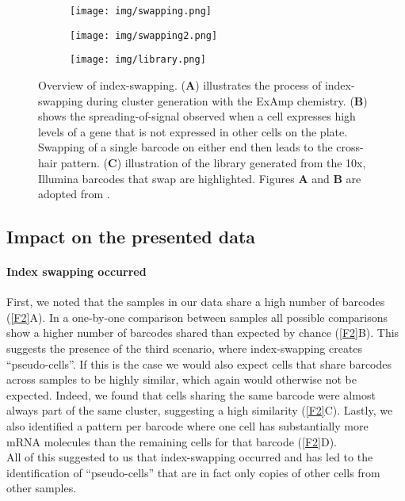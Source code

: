 \documentclass{article}
\begin{document}
\begin{figure}
    \begin{subfigure}[c]{0.5\textwidth}
	\texttt{[image: img/swapping.png]}
    \caption{}
    \end{subfigure}
    \begin{subfigure}[c]{0.5\textwidth}
	\texttt{[image: img/swapping2.png]}
    \caption{}
    \end{subfigure}
    \begin{subfigure}[c]{0.5\textwidth}
	\texttt{[image: img/library.png]}
    \caption{}
    \end{subfigure}
    \caption{Overview of index-swapping.
	(\textbf{A}) illustrates the process of index-swapping during cluster generation with the ExAmp chemistry.
	(\textbf{B}) shows the spreading-of-signal observed when a cell expresses high levels of a gene that is not expressed in other cells on the plate.
	Swapping of a single barcode on either end then leads to the cross-hair pattern.
	(\textbf{C}) illustration of the library generated from the 10x, Illumina barcodes that swap are highlighted. 
	Figures \textbf{A} and \textbf{B} are adopted from \autocite{Sinha2017}.
    }
    \label{F1}
\end{figure}

\subsection*{Impact on the presented data}
\paragraph{Index swapping occurred}
First, we noted that the samples in our data share a high number of barcodes (\autoref{F2}A).
In a one-by-one comparison between samples all possible comparisons show a higher number of barcodes shared than expected by chance (\autoref{F2}B).
This suggests the presence of the third scenario, where index-swapping creates ``pseudo-cells''.
If this is the case we would also expect cells that share barcodes across samples to be highly similar, which again would otherwise not be expected.
Indeed, we found that cells sharing the same barcode were almost always part of the same cluster, suggesting a high similarity (\autoref{F2}C).
Lastly, we also identified a pattern per barcode where one cell has substantially more mRNA molecules than the remaining cells for that barcode (\autoref{F2}D). \\
All of this suggested to us that index-swapping occurred and has led to the identification of ``pseudo-cells'' that are in fact only copies of other cells from other samples.\\
\end{document}
